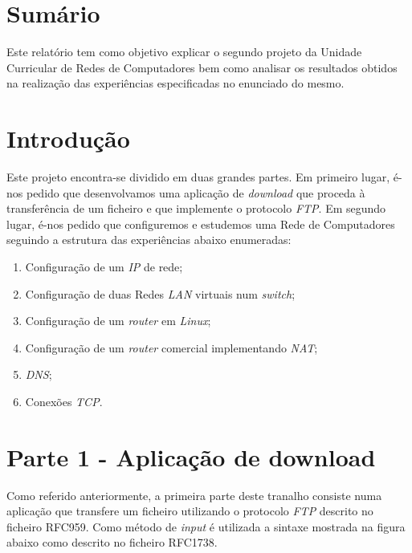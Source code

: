 \documentclass[a4paper]{article}
\begin{document}
	\maketitle
	\thispagestyle{empty}

	\newpage

	\tableofcontents	

	\newpage

	\section{Sumário}
	\normalsize

Este relatório tem como objetivo explicar o segundo projeto da Unidade Curricular de Redes de Computadores bem como analisar os resultados obtidos na realização das experiências especificadas no enunciado do mesmo.

	\section{Introdução}

	Este projeto encontra-se dividido em duas grandes partes. Em primeiro lugar, é-nos pedido que desenvolvamos uma aplicação de \textit{download} que proceda à transferência de um ficheiro e que implemente o protocolo \textit{FTP}. Em segundo lugar, é-nos pedido que configuremos e estudemos uma Rede de Computadores seguindo a estrutura das experiências abaixo enumeradas:

\begin{enumerate}

\item Configuração de um \textit{IP} de rede;
\item Configuração de duas Redes \textit{LAN} virtuais num \textit{switch};
\item Configuração de um \textit{router} em \textit{Linux};
\item Configuração de um \textit{router} comercial implementando \textit{NAT};
\item \textit{DNS};
\item Conexões \textit{TCP}.

\end{enumerate}

	\section{Parte 1 - Aplicação de download}

	Como referido anteriormente, a primeira parte deste tranalho consiste numa aplicação que transfere um ficheiro utilizando o protocolo \textit{FTP} descrito no ficheiro RFC959. Como método de \textit{input} é utilizada a sintaxe mostrada na figura abaixo como descrito no ficheiro RFC1738.
\end{document}
